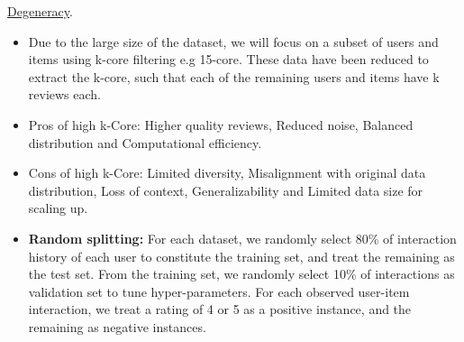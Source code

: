\documentclass{article}
\begin{document}
\begin{enumerate}
\begin{itemize}
                        \href{https://en.wikipedia.org/wiki/Degeneracy_(graph_theory)}{Degeneracy}.
                        \begin{itemize}
                              \item Due to the large size of the dataset, we
                                    will
                                    focus on a
                                    subset of users and items using k-core
                                    filtering
                                    e.g 15-core. These data have
                                    been reduced to extract the k-core, such
                                    that
                                    each of the remaining users and
                                    items have k reviews each.
                              \item Pros of high k-Core: Higher quality
                                    reviews,
                                    Reduced
                                    noise, Balanced distribution and
                                    Computational
                                    efficiency.
                              \item Cons of high k-Core: Limited diversity,
                                    Misalignment with
                                    original data distribution, Loss of
                                    context,
                                    Generalizability and Limited data
                                    size for scaling up.
                        \end{itemize}
            \end{itemize}
            \begin{itemize}
                  \item \textbf{Random splitting:} For each dataset, we
                        randomly select 80\% of interaction history of each
                        user to constitute the
                        training set, and treat the remaining as the test set.
                        From the training set, we randomly select 10\% of
                        interactions as validation set to tune
                        hyper-parameters.
                        For each observed user-item interaction, we treat a
                        rating of
                        4 or 5 as a positive instance, and the remaining as
                        negative instances.
                        \begin{itemize}

\end{itemize}
\end{itemize}
\end{enumerate}
\end{document}
